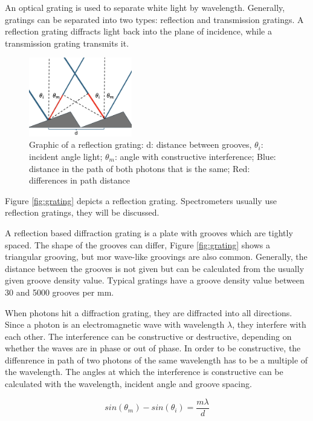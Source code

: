An optical grating is used to separate white light by wavelength. Generally, gratings can be separated into two types: reflection and transmission gratings. A reflection grating diffracts light back into the plane of incidence, while a transmission grating transmits it. 
\begin{figure}
    \centering
    \includegraphics[width=0.4\textwidth]{images/setup_graphics/grating_graphic.png}
    \caption{Graphic of a reflection grating: d: distance between grooves, \(\theta_i\): incident angle light; \(\theta_m\): angle with constructive interference; Blue: distance in the path of both photons that is the same; Red: differences in path distance}
    \label{fig:grating_graphic}
\end{figure}
Figure \ref{fig:grating} depicts a reflection grating. Spectrometers usually use reflection gratings, they will be discussed.

\bigskip

A reflection based diffraction grating is a plate with grooves which are tightly spaced. The shape of the grooves can differ, Figure \ref{fig:grating} shows a triangular grooving, but mor wave-like groovings are also common. Generally, the distance between the grooves is not given but can be calculated from the usually given groove density value. Typical gratings have a groove density value between 30 and 5000 grooves per mm.

\bigskip


When photons hit a diffraction grating, they are diffracted into all directions. Since a photon is an electromagnetic wave with wavelength \(\lambda\), they interfere with each other. The interference can be constructive or destructive, depending on whether the waves are in phase or out of phase. In order to be constructive, the diffenrence in path of two photons of the same wavelength has to be a multiple of the wavelength. The angles at which the interference is constructive can be calculated with the wavelength, incident angle and groove spacing.


\begin{equation}
     sin(\theta_m)-sin(\theta_i)=\frac{m \lambda}{d}
 \end{equation}

